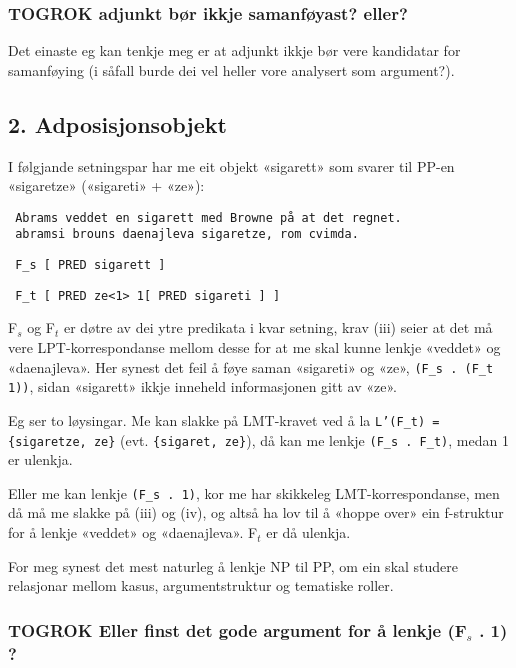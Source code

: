 \documentclass[11pt,a4paper,oneside,draft]{book}
\begin{document}
\subsubsection{\textbf{TOGROK} adjunkt bør ikkje samanføyast? eller?}
\label{sec-3.16.1.1}

Det einaste eg kan
tenkje meg er at adjunkt ikkje bør vere kandidatar for samanføying (i
såfall burde dei vel heller vore analysert som argument?).

\subsection{2. Adposisjonsobjekt}
\label{sec-3.16.2}


I følgjande setningspar har me eit objekt «sigarett» som svarer til
PP-en «sigaretze» («sigareti» + «ze»):

\begin{verbatim}
 Abrams veddet en sigarett med Browne på at det regnet.
 abramsi brouns daenajleva sigaretze, rom cvimda.
\end{verbatim}


\begin{verbatim}
 F_s [ PRED sigarett ]
\end{verbatim}


\begin{verbatim}
 F_t [ PRED ze<1> 1[ PRED sigareti ] ]
\end{verbatim}


F$_s$ og F$_t$ er døtre av dei ytre predikata i kvar setning, krav (iii)
seier at det må vere LPT-korrespondanse mellom desse for at me skal
kunne lenkje «veddet» og «daenajleva».  Her synest det feil å føye
saman «sigareti» og «ze», \texttt{(F\_s . (F\_t 1))}, sidan «sigarett» ikkje
inneheld informasjonen gitt av «ze».

Eg ser to løysingar. Me kan slakke på LMT-kravet ved å la \texttt{L'(F\_t) = \{sigaretze, ze\}} (evt. \texttt{\{sigaret, ze\}}), då kan me lenkje \texttt{(F\_s . F\_t)}, medan 1 er ulenkja.

Eller me kan lenkje \texttt{(F\_s . 1)}, kor me har skikkeleg
LMT-korrespondanse, men då må me slakke på (iii) og (iv), og altså ha
lov til å «hoppe over» ein f-struktur for å lenkje «veddet» og
«daenajleva». F$_t$ er då ulenkja.

For meg synest det mest naturleg å lenkje NP til PP, om ein skal
studere relasjonar mellom kasus, argumentstruktur og tematiske
roller. 
\subsubsection{\textbf{TOGROK} Eller finst det gode argument for å lenkje (F$_s$ . 1) ?}
\label{sec-3.16.2.1}
\end{document}
